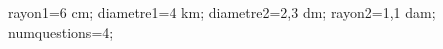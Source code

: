 \documentclass[exercice]{thedocument}%
\begin{document}
%
    \>rayon1=6 cm;%
    \>diametre1=4 km;%
    \>diametre2=2,3 dm;%
    \>rayon2=1,1 dam;%
    \>numquestions=4;%
\end{document}
